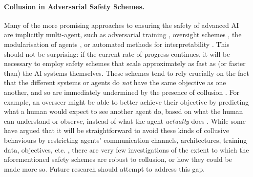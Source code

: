 \paragraph{Collusion in Adversarial Safety Schemes.}
Many of the more promising approaches to ensuring the safety of advanced AI are implicitly multi-agent, such as adversarial training \citep{Huang2011,Ziegler2022,Perez2022}, oversight schemes \citep{Irving2018,Christiano2018a,elk_report_2021,Greenblatt2023,Leike2018}, the modularisation of agents \citep{Drexler2019,Dalrymple2024}, or automated methods for interpretability \citep{bills2023language,Schwettmann2023}.
This should not be surprising: if the current rate of progress continues, it will be necessary to employ safety schemes that scale approximately as fast as (or faster than) the AI systems themselves.
These schemes tend to rely crucially on the fact that the different systems or agents do \textit{not} have the same objective as one another, and so are immediately undermined by the presence of collusion \citep{Goel2025}.
For example, an overseer might be able to better achieve their objective by predicting what a human would expect to see another agent do, based on what the human can understand or observe, instead of what the agent \textit{actually} does \citep{elk_report_2021}.
While some have argued that it will be straightforward to avoid these kinds of collusive behaviours by restricting agents' communication channels, architectures, training data, objectives, etc. \citep{Drexler2022}, there are very few investigations of the extent to which the aforementioned safety schemes are robust to collusion, or how they could be made more so.
Future research should attempt to address this gap.







